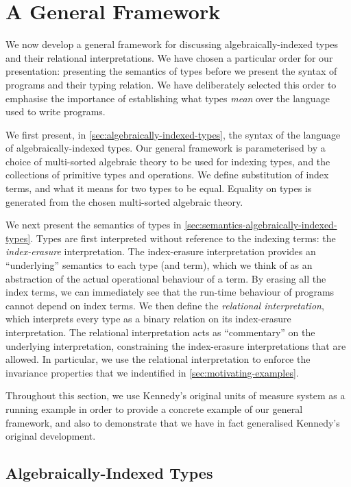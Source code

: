 \section{A General Framework}
\label{sec:a-general-framework}

We now develop a general framework for discussing
algebraically-indexed types and their relational interpretations. We
have chosen a particular order for our presentation: presenting the
semantics of types before we present the syntax of programs and their
typing relation. We have deliberately selected this order to emphasise
the importance of establishing what types \emph{mean} over the
language used to write programs.

We first present, in \autoref{sec:algebraically-indexed-types}, the
syntax of the language of algebraically-indexed types. Our general
framework is parameterised by a choice of multi-sorted algebraic
theory to be used for indexing types, and the collections of primitive
types and
operations. %
We define substitution of index terms, and what it means for two types
to be equal. Equality on types is generated from the chosen
multi-sorted algebraic theory.

We next present the semantics of types in
\autoref{sec:semantics-algebraically-indexed-types}. Types are first
interpreted without reference to the indexing terms: the
\emph{index-erasure} interpretation. The index-erasure interpretation
provides an ``underlying'' semantics to each type (and term), which we
think of as an abstraction of the actual operational behaviour of a
term. By erasing all the index terms, we can immediately see that the
run-time behaviour of programs cannot depend on index terms. We then
define the \emph{relational interpretation}, which interprets every
type as a binary relation on its index-erasure interpretation. The
relational interpretation acts as ``commentary'' on the underlying
interpretation, constraining the index-erasure interpretations that
are allowed. In particular, we use the relational interpretation to
enforce the invariance properties that we indentified in
\autoref{sec:motivating-examples}.

Throughout this section, we use Kennedy's original units of measure
system as a running example in order to provide a concrete example of
our general framework, and also to demonstrate that we have in fact
generalised Kennedy's original development.

\subsection{Algebraically-Indexed Types}
\label{sec:algebraically-indexed-types}

